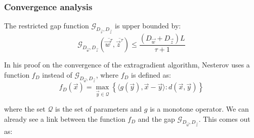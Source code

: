 \subsubsection{Convergence analysis} The restricted gap function
$\mathcal{G}_{D_{\vec v}, D_{\vec z}}$ is upper bounded by:
\begin{equation} \mathcal{G}_{D_{\vec w}, D_{\vec z}}(\overline{\vec w^{\tau}},
\overline{\vec z^{\tau}}) \leq \frac{\left( D_{\vec w} + D_{\vec z} \right)
L}{\tau + 1}
\label{eq:ub}
\end{equation}

In his proof on the convergence of the extragradient algorithm, Nesterov uses a
function $f_D$ instead of $\mathcal{G}_{D_{\vec w}, D_{\vec z}}$, where $f_D$ is
defined as:
\begin{equation}
f_D(\vec x) = \max_{\vec y \in \mathcal{Q}} \left \{ \langle g(\vec y), \vec x -
\vec y \rangle : d(\vec x, \vec y) \right \}
\end{equation}

where the set $\mathcal{Q}$ is the set of parameters and $g$ is a monotone
operator. We can already see a link between the function $f_D$ and the gap
$\mathcal{G}_{D_{\vec w}, D_{\vec z}}$. This comes out as:

